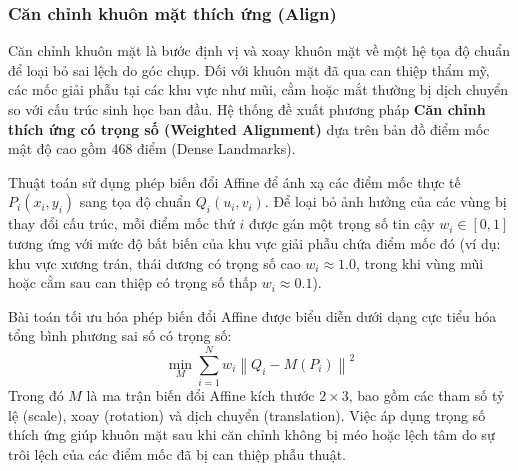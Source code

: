 \subsubsection{Căn chỉnh khuôn mặt thích ứng (Align)}
Căn chỉnh khuôn mặt là bước định vị và xoay khuôn mặt về một hệ tọa độ chuẩn để loại bỏ sai lệch do góc chụp. Đối với khuôn mặt đã qua can thiệp thẩm mỹ, các mốc giải phẫu tại các khu vực như mũi, cằm hoặc mắt thường bị dịch chuyển so với cấu trúc sinh học ban đầu. Hệ thống đề xuất phương pháp \textbf{Căn chỉnh thích ứng có trọng số (Weighted Alignment)} dựa trên bản đồ điểm mốc mật độ cao gồm 468 điểm (Dense Landmarks).

Thuật toán sử dụng phép biến đổi Affine để ánh xạ các điểm mốc thực tế $P_i(x_i, y_i)$ sang tọa độ chuẩn $Q_i(u_i, v_i)$. Để loại bỏ ảnh hưởng của các vùng bị thay đổi cấu trúc, mỗi điểm mốc thứ $i$ được gán một trọng số tin cậy $w_i \in [0, 1]$ tương ứng với mức độ bất biến của khu vực giải phẫu chứa điểm mốc đó (ví dụ: khu vực xương trán, thái dương có trọng số cao $w_i \approx 1.0$, trong khi vùng mũi hoặc cằm sau can thiệp có trọng số thấp $w_i \approx 0.1$).

Bài toán tối ưu hóa phép biến đổi Affine được biểu diễn dưới dạng cực tiểu hóa tổng bình phương sai số có trọng số:
\begin{equation}
    \min_{M} \sum_{i=1}^{N} w_i \left\| Q_i - M(P_i) \right\|^2
\end{equation}
Trong đó $M$ là ma trận biến đổi Affine kích thước $2 \times 3$, bao gồm các tham số tỷ lệ (scale), xoay (rotation) và dịch chuyển (translation). Việc áp dụng trọng số thích ứng giúp khuôn mặt sau khi căn chỉnh không bị méo hoặc lệch tâm do sự trôi lệch của các điểm mốc đã bị can thiệp phẫu thuật.

